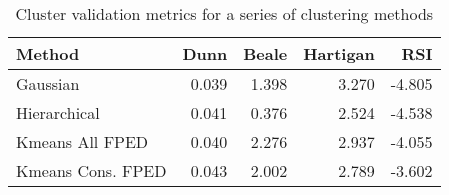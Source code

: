 \begin{table}[h]
\caption{Cluster validation metrics for a series of clustering methods}
\label{tab:cluster_metrics}
\begin{tabular}{lrrrr}
\toprule
Method & Dunn & Beale & Hartigan & RSI \\
\midrule
Gaussian & 0.039 & 1.398 & 3.270 & -4.805 \\
Hierarchical & 0.041 & 0.376 & 2.524 & -4.538 \\
Kmeans All FPED & 0.040 & 2.276 & 2.937 & -4.055 \\
Kmeans Cons. FPED & 0.043 & 2.002 & 2.789 & -3.602 \\
\bottomrule
\end{tabular}
\end{table}
